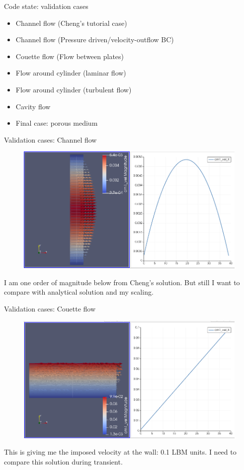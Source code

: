 \documentclass{beamer}
\begin{document}
	\begin{frame}{Code state: validation cases}
		\begin{itemize}
			\item \alert{Channel flow (Cheng's tutorial case)}
			\item Channel flow (Pressure driven/velocity-outflow BC)
			\item \alert{Couette flow (Flow between plates)}
			\item Flow around cylinder (laminar flow)
			\item \alert{Flow around cylinder (turbulent flow)}
			\item \alert{Cavity flow}
			\item Final case: porous medium
		\end{itemize}
	\end{frame}
	
	\begin{frame}{Validation cases: Channel flow}
		\begin{figure}
			\includegraphics[scale=0.3]{pics/channelForceDriven.png}
		\end{figure}
	I am one order of magnitude below from Cheng's solution. But still I want to compare with analytical solution and my scaling.
	\end{frame}
	
	\begin{frame}{Validation cases: Couette flow}
		\begin{figure}
			\includegraphics[scale=0.3]{pics/couetteFlow.png}
		\end{figure}
	This is giving me the imposed velocity at the wall: 0.1 LBM units. I need to compare this solution during transient.
	\end{frame}
\end{document}
